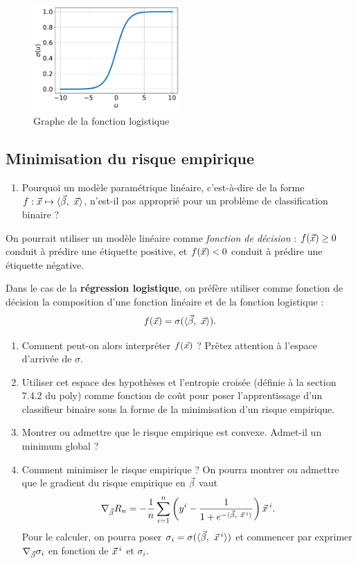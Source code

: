 \documentclass[french,11pt]{article}
\begin{document}
\begin{figure}[h]
  \centering
  \includegraphics[width=0.5\textwidth]{figures/logistic}
  \caption{Graphe de la fonction logistique}
  \label{fig:logistic}
\end{figure}

\subsection{Minimisation du risque empirique}    
\begin{enumerate}
\item Pourquoi un modèle paramétrique linéaire, c'est-à-dire de la forme
  $f: \xx \mapsto \innerproduct{\bbeta,~\xx}$, n'est-il pas approprié pour un problème de
  classification binaire ?
\end{enumerate}

On pourrait utiliser un modèle linéaire comme \textit{fonction de décision} :
$f(\xx) \geq 0$ conduit à prédire une étiquette positive, et $f(\xx) < 0$
conduit à prédire une étiquette négative.

Dans le cas de la \textbf{régression logistique}, on préfère utiliser comme
fonction de décision la composition d'une fonction linéaire et de la fonction
logistique :
\begin{equation}
  f(\xx) = \sigma(\innerproduct{\bbeta,~\xx}).
  \label{eq:logistic_model}
\end{equation}
\begin{enumerate}[resume]
\item 
  Comment peut-on alors interpréter $f(\xx)$ ? Prêtez attention à l'espace
  d'arrivée de $\sigma$.
\item Utiliser cet espace des hypothèses et l'entropie croisée
  (définie à la section 7.4.2 du poly) comme fonction de coût pour poser l'apprentissage d'un
  classifieur binaire sous la forme de la minimisation d'un risque empirique.
\item Montrer ou admettre que le risque empirique est convexe. Admet-il un minimum global ? 
\item Comment minimiser le risque empirique ? On pourra montrer ou admettre que le gradient du risque empirique en $\bbeta$ vaut 
    \begin{equation*}
      \nabla_{\bbeta}R_n = - \frac1n \sum_{i=1}^n \left(y^i - \frac1{1 + e^{-\innerproduct{\bbeta,~\xx^i}}} \right) \xx^i.
    \end{equation*}
    Pour le calculer, on pourra poser
    $\sigma_i = \sigma(\innerproduct{\bbeta,~\xx^i})$ et commencer par exprimer
    $\nabla_{\bbeta} \sigma_i$ en fonction de $\xx^i$ et $\sigma_i$.
\end{enumerate}
\end{document}
